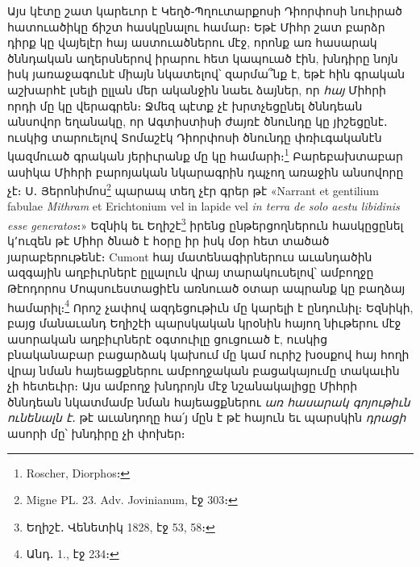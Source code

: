 \documentclass{article}
\begin{document}
{Այս կէտը շատ կարեւոր է Կեղծ֊Պղուտարքոսի Դիորփոսի նուիրած հատուածիկը ճիշտ հասկընալու համար։ Եթէ Միհր շատ բարձր դիրք կը վայելէր հայ աստուածներու մէջ, որոնք առ հասարակ ծննդական աղերսներով իրարու հետ կապուած էին, խնդիրը նոյն իսկ յառաջագունէ միայն նկատելով՝ զարմա՞նք է, եթէ հին գրական աշխարհէ լսելի ըլլան մեր ականջին նաեւ ձայներ, որ \emph{հայ} Միհրի որդի մը կը վերագրեն։ Ջմեզ պէտք չէ խրտչեցընել ծննդեան անսովոր եղանակը, որ Ագտիստիսի ժայռէ ծնունդը կը յիշեցընէ․ ուսկից տարուելով Տոմաշէկ Դիորփոսի ծնունդը փռիւգականէն կազմուած գրական յերիւրանք մը կը համարի։\footnote{Roscher, Diorphos։} Բարեբախտաբար ասիկա Միհրի բարոյական նկարագրին դպչող առաջին անսովորը չէ։ Ս․ Յերոնիմոս\footnote{Migne PL. 23. Adv. Jovinianum, էջ 303։} պարապ տեղ չէր գրեր թէ «Narrant et gentilium fabulae \emph{Mithram} et Erichtonium vel in lapide vel \emph{in terra de solo aestu libidinis esse generatos}։» Եզնիկ եւ Եղիշէ\footnote{Եղիշէ․ Վենետիկ 1828, էջ 53, 58։} իրենց ընթերցողներուն հասկըցընել կ՚ուզեն թէ Միհր ծնած է հօրը իր իսկ մօր հետ տածած յարաբերութենէ։ Cumont հայ մատենագիրներուս աւանդածին ազգային աղբիւրներէ ըլլալուն վրայ տարակուսելով՝ ամբողջը Թէոդորոս Մոպսուեստացիէն առնուած օտար ապրանք կը բաղձայ համարիլ։\footnote{Անդ․ 1., էջ 234։} Որոշ չափով ազդեցութիւն մը կարելի է ընդունիլ։ Եզնիկի, բայց մանաւանդ Եղիշէի պարսկական կրօնին հայող նիւթերու մէջ ասորական աղբիւրներէ օգտուիլը ցուցուած է, ուսկից բնականաբար բացարձակ կախում մը կամ ուրիշ խօսքով հայ հողի վրայ նման հայեացքներու ամբողջական բացակայումը տակաւին չի հետեւիր։ Այս ամբողջ խնդրոյն մէջ նշանակալիցը Միհրի ծննդեան նկատմամբ նման հայեացքներու \emph{առ հասարակ գոյութիւն ունենալն է․} թէ աւանդողը հա՛յ մըն է թէ հայուն եւ պարսկին \emph{դրացի} ասորի մը՝ խնդիրը չի փոխեր։

}
\end{document}
